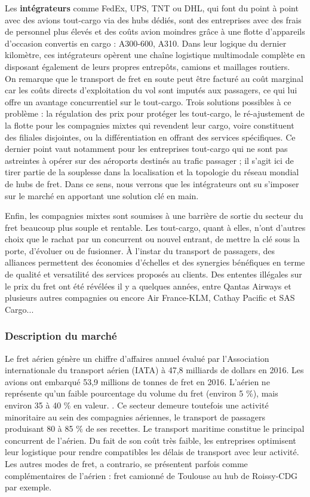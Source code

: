 Les \textbf{intégrateurs}\label{integrateurs} comme FedEx, UPS, TNT ou DHL, qui font du point à point avec des avions tout-cargo via des hubs dédiés, sont des entreprises avec des frais de personnel plus élevés et des coûts avion moindres grâce à une flotte d'appareils d’occasion convertis en cargo : A300-600, A310. \cite{lantenne} Dans leur logique du dernier kilomètre, ces intégrateurs opèrent une chaîne logistique multimodale complète en disposant également de leurs propres entrepôts, camions et maillages routiers.\\

On remarque que le transport de fret en soute peut être facturé au coût marginal car les coûts directs d'exploitation du vol sont imputés aux passagers, ce qui lui offre un avantage concurrentiel sur le tout-cargo. Trois solutions possibles à ce problème : la régulation des prix pour protéger les tout-cargo, le ré-ajustement de la flotte pour les compagnies mixtes qui revendent leur cargo, voire constituent des filiales disjointes, ou la différentiation en offrant des services spécifiques. Ce dernier point vaut notamment pour les entreprises tout-cargo qui ne sont pas astreintes à opérer sur des aéroports destinés au trafic passager ; il s'agit ici de tirer partie
de la souplesse dans la localisation et la topologie du réseau mondial de hubs de fret. Dans ce sens, nous verrons que les intégrateurs ont su s'imposer sur le marché en apportant une solution clé en main.


Enfin, les compagnies mixtes sont soumises à une barrière de sortie du secteur du fret beaucoup plus souple et rentable. Les tout-cargo, quant à elles, n'ont d'autres choix que le rachat par un concurrent ou nouvel entrant, de mettre la clé sous la porte, d'évoluer ou de fusionner. À l'instar du transport de passagers, des alliances permettent des économies d'échelles et des synergies bénéfiques en terme de qualité et versatilité des services proposés au clients. Des ententes illégales sur le prix du fret ont été révélées il y a quelques années, entre Qantas Airways et plusieurs autres compagnies ou encore Air France-KLM, Cathay Pacific et SAS Cargo...\cite{popescu}


\subsubsection{Description du marché}
Le fret aérien génère un chiffre d’affaires annuel évalué par l’Association internationale du transport aérien (IATA) à 47,8 milliards de dollars en 2016. Les avions ont embarqué 53,9 millions de tonnes de fret en 2016. L’aérien ne représente qu’un faible pourcentage du volume du fret (environ 5 \%),
mais environ 35 à 40 \% en valeur. \cite{lantenne}. Ce secteur demeure toutefois une activité minoritaire au sein des compagnies aériennes, le transport de passagers produisant 80 à 85 \% de ses recettes. Le transport maritime constitue le principal concurrent de l’aérien. Du fait de son coût très faible, les entreprises optimisent leur logistique pour rendre compatibles les délais de transport avec leur activité. Les autres modes de fret, a contrario, se présentent parfois comme complémentaires de l'aérien : fret camionné de Toulouse au hub de Roissy-CDG par exemple.

